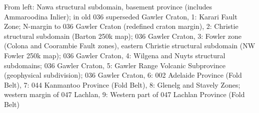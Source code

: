 From left: Nawa structural subdomain, basement province (includes Ammaroodina Inlier); in old 036 {superseded} Gawler Craton, 1: Karari Fault Zone; N-margin to 036 Gawler Craton (redefined craton margin), 2: Christie structural subdomain (Barton 250k map); 036 Gawler Craton, 3: Fowler zone (Colona and Coorambie Fault zones), eastern Christie structural subdomain (NW Fowler 250k map); 036 Gawler Craton, 4: Wilgena and Nuyts structural subdomains; 036 Gawler Craton, 5: Gawler Range Volcanic Subprovince (geophysical subdivision); 036 Gawler Craton, 6: 002 Adelaide Province (Fold Belt), 7: 044 Kanmantoo Province (Fold Belt), 8: Glenelg and Stavely Zones; western margin of 047 Lachlan, 9: Western part of 047 Lachlan Province (Fold Belt)
